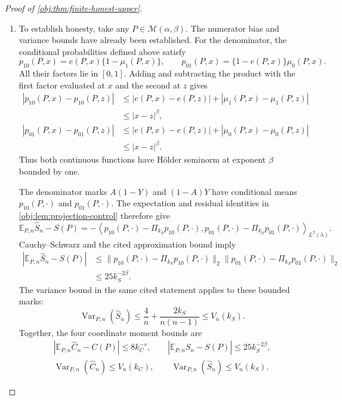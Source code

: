 \documentclass[11pt]{article}
\begin{document}
\begin{proof}[Proof of \cref{obj:thm:finite-honest-upper}]
\begin{enumerate}
\item To establish honesty, take any \(P\in\mathcal M(\alpha,\beta)\).
The numerator bias and variance bounds have already been established. For the denominator, the conditional probabilities defined above satisfy
\[
p_{10}(P,x)=e(P,x)\{1-\mu_1(P,x)\},
\qquad
p_{01}(P,x)=\{1-e(P,x)\}\mu_0(P,x).
\]
All their factors lie in \([0,1]\). Adding and subtracting the product with the first factor evaluated at \(x\) and the second at \(z\) gives
\[
\begin{aligned}
|p_{10}(P,x)-p_{10}(P,z)|
&\le |e(P,x)-e(P,z)|
   +|\mu_1(P,x)-\mu_1(P,z)|\\
&\le |x-z|^\beta,\\
|p_{01}(P,x)-p_{01}(P,z)|
&\le |e(P,x)-e(P,z)|
   +|\mu_0(P,x)-\mu_0(P,z)|\\
&\le |x-z|^\beta.
\end{aligned}
\]
Thus both continuous functions have Hölder seminorm at exponent \(\beta\) bounded by one.

The denominator marks \(A(1-Y)\) and \((1-A)Y\) have conditional means \(p_{10}(P,\cdot)\) and \(p_{01}(P,\cdot)\).
The expectation and residual identities in \cref{obj:lem:projection-control} therefore give
\[
\mathbb E_{P,n}\widehat S_n-S(P)
=
-\left\langle
p_{10}(P,\cdot)-\Pi_{k_S}p_{10}(P,\cdot),
p_{01}(P,\cdot)-\Pi_{k_S}p_{01}(P,\cdot)
\right\rangle_{L^2(\lambda)}.
\]
Cauchy--Schwarz and the cited approximation bound imply
\[
\begin{aligned}
|\mathbb E_{P,n}\widehat S_n-S(P)|
&\le
\|p_{10}(P,\cdot)-\Pi_{k_S}p_{10}(P,\cdot)\|_2
\|p_{01}(P,\cdot)-\Pi_{k_S}p_{01}(P,\cdot)\|_2\\
&\le25k_S^{-2\beta}.
\end{aligned}
\]
The variance bound in the same cited statement applies to these bounded marks:
\[
\operatorname{Var}_{P,n}(\widehat S_n)
\le\frac4n+\frac{2k_S}{n(n-1)}
\le V_n(k_S).
\]
Together, the four coordinate moment bounds are
\[
\begin{gathered}
|\mathbb E_{P,n}\widehat C_n-C(P)|\le8k_C^{-s},
\qquad
|\mathbb E_{P,n}\widehat S_n-S(P)|\le25k_S^{-2\beta},\\
\operatorname{Var}_{P,n}(\widehat C_n)\le V_n(k_C),
\qquad
\operatorname{Var}_{P,n}(\widehat S_n)\le V_n(k_S).
\end{gathered}
\]


\end{enumerate}
\end{proof}
\end{document}

